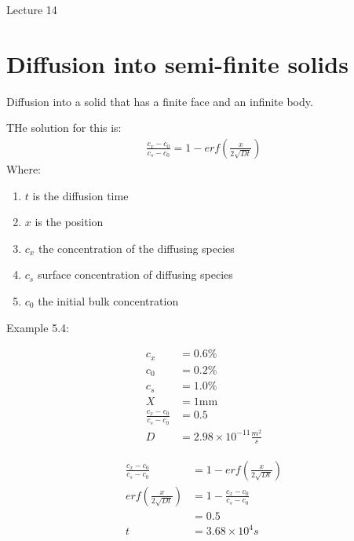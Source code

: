 \documentclass{article}
\begin{document}
\Huge
Lecture 14

\normalsize

\section{Diffusion into semi-finite solids}

Diffusion into a solid that has a finite face and an infinite body.

THe solution for this is:
\begin{equation}
    \begin{split}
        \frac{c_x -c_0}{c_s - c_0} = 1 - \textit{erf}(\frac{x}{2\sqrt{Dt}})
    \end{split}
\end{equation}
Where:
\begin{enumerate}
    \item $t$ is the diffusion time
    \item $x$ is the position
    \item $c_x$ the concentration of the diffusing species
    \item $c_s$ surface concentration of diffusing species
    \item $c_0$ the initial bulk concentration
\end{enumerate}

Example 5.4:

\begin{equation}
    \begin{split}
    c_x &= 0.6\% \\
    c_0 &= 0.2\% \\
    c_s &= 1.0\% \\
    X &= 1\text{mm} \\
    \frac{c_x-c_0}{c_s-c_0} &= 0.5 \\
    D &= 2.98 \times 10^{-11} \frac{m^2}{s}
    \end{split}
\end{equation}

\begin{equation}
    \begin{split}
        \frac{c_x -c_0}{c_s - c_0} &= 1 - \textit{erf}(\frac{x}{2\sqrt{Dt}}) \\
        \textit{erf}(\frac{x}{2\sqrt{Dt}}) &= 1 - \frac{c_x -c_0}{c_s - c_0} \\ 
        &= 0.5 \\
        t &= 3.68\times 10^4s
    \end{split}
\end{equation}
\end{document}
